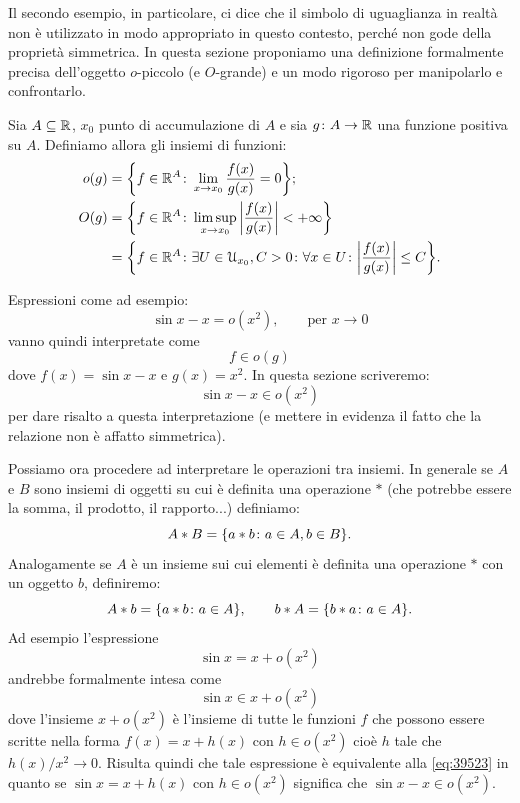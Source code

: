 Il secondo esempio, in particolare, ci dice che il simbolo di uguaglianza in realtà non è utilizzato in modo appropriato in questo contesto, perché non gode della proprietà simmetrica. In questa sezione proponiamo una definizione formalmente precisa dell'oggetto $o$-piccolo (e $O$-grande) e un modo rigoroso per manipolarlo e confrontarlo.

\begin{definition}
Sia $A\subseteq {\mathbb R}$, $x_0$ punto di accumulazione di $A$
e sia $g\colon A \to {\mathbb R}$ una funzione positiva su $A$.
Definiamo allora gli insiemi di funzioni:
\begin{align*}
  o(g) &= {\left\{ f\in {\mathbb R}^A \colon \lim_{x\to x_0}\frac{f(x)}{g(x)} = 0 \right\}};\\
  O(g) &= {\left\{ f\in {\mathbb R}^A \colon \limsup_{x\to x_0}{\left|\frac{f(x)}{g(x)}\right|} < + \infty \right\}}\\
       &= {\left\{ f\in {\mathbb R}^A \colon \exists U\in \mathcal U_{x_0}, C>0 \colon \forall x \in U\colon {\left|\frac{f(x)}{g(x)}\right|}\le C \right\}}.
\end{align*}
\end{definition}

Espressioni come ad esempio:
\[
  \sin x - x = o(x^2), \qquad \text{per $x\to 0$}
\]
vanno quindi interpretate come
\[
  f \in o(g)
\]
dove $f(x) = \sin x -x $ e $g(x) = x^2$.
In questa sezione scriveremo:
\begin{equation}\label{eq:39523}
  \sin x - x \in o(x^2)
\end{equation}
per dare risalto a questa interpretazione (e mettere in evidenza il fatto che la relazione non è affatto simmetrica).

Possiamo ora procedere ad interpretare le operazioni tra insiemi. In generale se $A$ e $B$ sono insiemi di oggetti su cui è definita una operazione $*$ (che potrebbe essere la somma, il prodotto, il rapporto...) definiamo:
\[
  A * B = {\left\{ a*b \colon a \in A, b\in B \right\}}.
\]
Analogamente se $A$ è un insieme sui cui elementi è definita una operazione $*$ con un oggetto $b$, definiremo:
\[
  A * b = {\left\{ a*b\colon a \in A \right\}}, \qquad
  b * A = {\left\{ b*a\colon a \in A \right\}}.
\]
Ad esempio l'espressione
\[
  \sin x = x + o(x^2)
\]
andrebbe formalmente intesa come
\[
  \sin x  \in x + o(x^2)
\]
dove l'insieme $x+ o(x^2)$ è l'insieme di tutte le funzioni
$f$ che possono essere scritte nella forma $f(x) = x+h(x)$ con $h\in o(x^2)$ cioè $h$ tale che $h(x)/x^2 \to 0$. Risulta quindi che tale espressione è equivalente alla \eqref{eq:39523} in quanto se $\sin x = x + h(x)$ con $h\in o(x^2)$ significa che $\sin x- x \in o(x^2)$.


